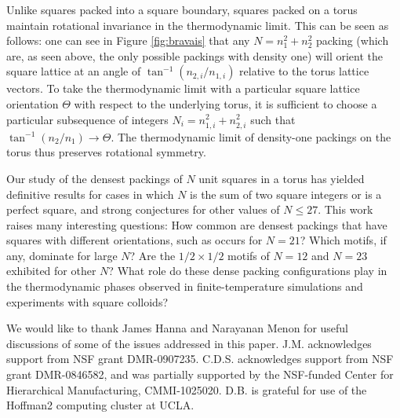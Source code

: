\documentclass[aps]{revtex4}
\begin{document}
Unlike squares packed into a square boundary, squares packed on a torus maintain rotational invariance in the thermodynamic limit.  This can be seen as follows: one can see in Figure \ref{fig:bravais} that any $N=n_1^2+n_2^2$ packing (which are, as seen above, the only possible packings with density one) will orient the square lattice at an angle of $\tan^{-1}(n_{2,i}/n_{1,i})$ relative to the torus lattice vectors.  To take the thermodynamic limit with a particular square lattice orientation $\Theta$ with respect to the underlying torus, it is sufficient to choose a particular subsequence of integers $N_i=n_{1,i}^2+n_{2,i}^2$ such that 
$\tan^{-1}(n_2/n_1) \rightarrow \Theta$.
The thermodynamic limit of density-one packings on the torus thus preserves rotational symmetry.


Our study of the densest packings of $N$ unit squares in a torus has yielded definitive results for cases in which $N$ is the sum of two square integers or is a perfect square, and strong conjectures for other values of $N \le 27$.  This work raises many interesting questions: How common are densest packings that have squares with different orientations, such as occurs for $N=21$?  Which motifs, if any, dominate for large $N$?  Are the $1/2 \times 1/2$ motifs of $N=12$ and $N=23$ exhibited for other $N$? What role do these dense packing configurations play in the thermodynamic phases observed in finite-temperature simulations and experiments with square colloids?


\begin{acknowledgements}
We would like to thank James Hanna and Narayanan Menon for useful discussions of some of the issues addressed in this paper.  J.M. acknowledges support from NSF grant DMR-0907235. C.D.S. acknowledges support from NSF grant DMR-0846582, and was partially supported by the NSF-funded Center for Hierarchical Manufacturing, CMMI-1025020. D.B. is grateful for use of the Hoffman2 computing cluster at UCLA.
\end{acknowledgements}
\end{document}
